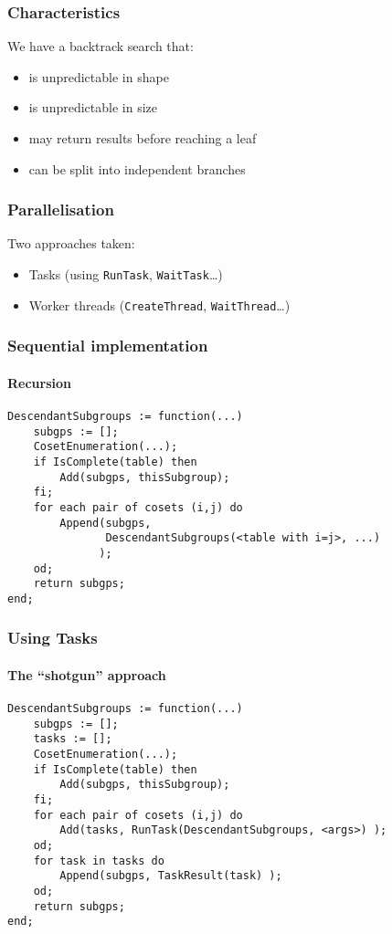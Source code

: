 \documentclass{beamer}
\begin{document}
\begin{frame}
  \frametitle{Characteristics}
  We have a backtrack search that: \pause
  \begin{itemize}
  \item is unpredictable in shape \pause
  \item is unpredictable in size \pause
  \item may return results before reaching a leaf \pause
  \item can be split into independent branches
  \end{itemize}
\end{frame}

\begin{frame}
  \frametitle{Parallelisation}
  Two approaches taken:
  \begin{itemize}
  \item Tasks (using \texttt{RunTask}, \texttt{WaitTask}\dots)
  \item Worker threads (\texttt{CreateThread}, \texttt{WaitThread}\dots)
  \end{itemize}
\end{frame}

\begin{frame}[fragile]
  \frametitle{Sequential implementation}
  \framesubtitle{Recursion}
\begin{verbatim}
DescendantSubgroups := function(...)
    subgps := [];
    CosetEnumeration(...);
    if IsComplete(table) then
        Add(subgps, thisSubgroup);
    fi;
    for each pair of cosets (i,j) do
        Append(subgps,
               DescendantSubgroups(<table with i=j>, ...)
              );
    od;
    return subgps;
end;
\end{verbatim}
\end{frame}

\begin{frame}[fragile]
  \frametitle{Using Tasks}
  \framesubtitle{The ``shotgun'' approach}
\begin{verbatim}
DescendantSubgroups := function(...)
    subgps := [];
    tasks := [];
    CosetEnumeration(...);
    if IsComplete(table) then
        Add(subgps, thisSubgroup);
    fi;
    for each pair of cosets (i,j) do
        Add(tasks, RunTask(DescendantSubgroups, <args>) );
    od;
    for task in tasks do
        Append(subgps, TaskResult(task) );
    od;
    return subgps;
end;
\end{verbatim}

\end{frame}
\end{document}
